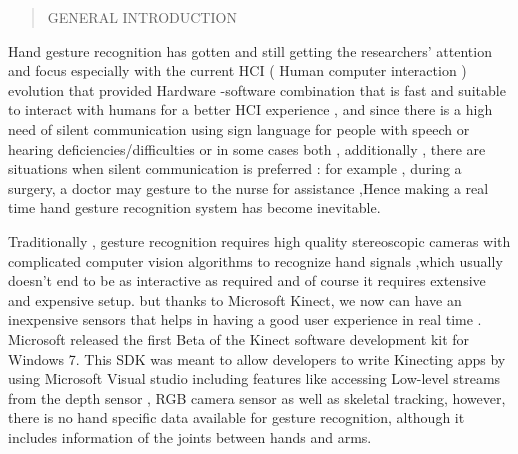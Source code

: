 \begin{quote}
 
\centering

    {
\huge 

GENERAL  INTRODUCTION 

}
\end{quote}


\vspace{1.5cm}

Hand gesture recognition  has gotten and still getting the researchers' attention and focus especially with the current HCI ( Human computer interaction ) evolution that provided Hardware -software  combination that is fast and suitable to interact with humans for a better HCI experience , and since there is a high need of silent communication using sign language for people with speech or  hearing  deficiencies/difficulties or in some cases both , additionally , there are situations when silent communication is preferred : for example , during a surgery,  a doctor may gesture to the nurse for assistance ,Hence making a real time  hand gesture recognition system has become inevitable.

Traditionally , gesture recognition requires high quality stereoscopic cameras with complicated computer vision algorithms to recognize hand signals ,which usually doesn't end to be as interactive as required and of course it requires extensive and expensive setup. but thanks to Microsoft  Kinect, we now can have  an inexpensive  sensors  that helps in having a good user experience in real time .\\
Microsoft released the first Beta of the Kinect software development kit for Windows 7. This SDK was meant to allow developers to write Kinecting apps by using Microsoft Visual studio including features like accessing Low-level streams from the depth sensor , RGB camera sensor   as well as skeletal  tracking, however,  there  is no hand  specific  data  available for  gesture   recognition,   although    it   includes   information    of the  joints   between  hands   and  arms.

